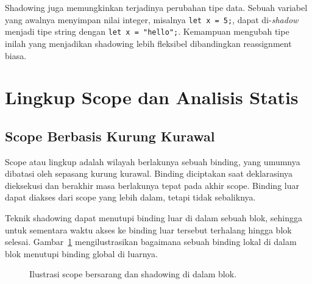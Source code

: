 \documentclass[11pt,a4paper]{article}
\begin{document}
Shadowing juga memungkinkan terjadinya perubahan tipe data. Sebuah variabel yang awalnya menyimpan nilai integer, misalnya \texttt{let x = 5;}, dapat di-\textit{shadow} menjadi tipe string dengan \texttt{let x = "hello";}. Kemampuan mengubah tipe inilah yang menjadikan shadowing lebih fleksibel dibandingkan reassignment biasa.

\section{Lingkup Scope dan Analisis Statis}

\subsection{Scope Berbasis Kurung Kurawal}

Scope atau lingkup adalah wilayah berlakunya sebuah binding, yang umumnya dibatasi oleh sepasang kurung kurawal. Binding diciptakan saat deklarasinya dieksekusi dan berakhir masa berlakunya tepat pada akhir scope. Binding luar dapat diakses dari scope yang lebih dalam, tetapi tidak sebaliknya.

Teknik shadowing dapat menutupi binding luar di dalam sebuah blok, sehingga untuk sementara waktu akses ke binding luar tersebut terhalang hingga blok selesai. Gambar~\ref{fig:scope} mengilustrasikan bagaimana sebuah binding lokal di dalam blok menutupi binding global di luarnya.

\begin{figure}[H]
	\centering
	\caption{Ilustrasi scope bersarang dan shadowing di dalam blok.}
	\label{fig:scope}
\end{figure}
\end{document}
